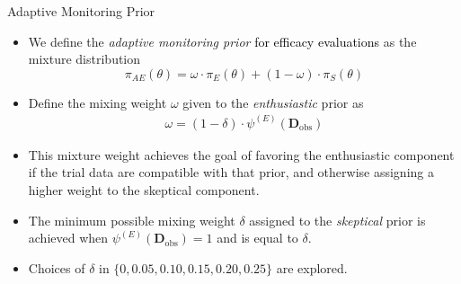 \documentclass{beamer}
\begin{document}
\begin{frame}{Adaptive Monitoring Prior}
\begin{itemize}
\item 
We define the \textit{adaptive monitoring prior} \textcolor{black}{for efficacy evaluations} as the mixture distribution	
\begin{equation}\label{eq:inference_prior}
	\pi_{AE}\left(\theta\right)=\omega\cdot\pi_E(\theta)+(1 - \omega)\cdot \pi_S(\theta)
\end{equation}
\item
Define the mixing weight $\omega$ given to the \textit{enthusiastic} prior as
\begin{align}\label{eq:omega}
\omega= (1 - \delta)\cdot\psi^{(E)}(\mathbf{D}_{\text{obs}})
\end{align}
\item This mixture weight achieves the goal of favoring the enthusiastic component if the trial data are compatible with that prior, and otherwise assigning a higher weight to the skeptical component. 
\item The minimum possible mixing weight $\delta$ assigned to the \textit{skeptical} prior is achieved when $\psi^{(E)}(\mathbf{D}_{\text{obs}})=1$ and is equal to $\delta$. 
\item Choices of $\delta$ in $\{0, 0.05, 0.10, 0.15, 0.20, 0.25\}$ are explored.
\end{itemize}
\end{frame}
\end{document}
